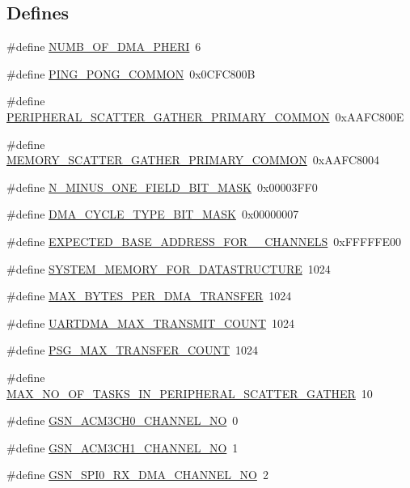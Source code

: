 \subsection*{Defines}
\begin{DoxyCompactItemize}
\item 
\#define \hyperlink{a00484_ae8e73cb3b2b2a19fc917950debfee711}{NUMB\_\-OF\_\-DMA\_\-PHERI}~6
\item 
\#define \hyperlink{a00484_a77c40078080da55358bb95deabdc19d2}{PING\_\-PONG\_\-COMMON}~0x0CFC800B
\item 
\#define \hyperlink{a00484_aca65a0bf3bfd12532c02dae5c279e8ea}{PERIPHERAL\_\-SCATTER\_\-GATHER\_\-PRIMARY\_\-COMMON}~0xAAFC800E
\item 
\#define \hyperlink{a00484_acbb264dcf72e5f414bd8ce4b5e993744}{MEMORY\_\-SCATTER\_\-GATHER\_\-PRIMARY\_\-COMMON}~0xAAFC8004
\item 
\#define \hyperlink{a00484_af41f9d4a535f48887520e136af1c4db1}{N\_\-MINUS\_\-ONE\_\-FIELD\_\-BIT\_\-MASK}~0x00003FF0
\item 
\#define \hyperlink{a00484_a40e72b47ba3036307ccfb8df8ce6437d}{DMA\_\-CYCLE\_\-TYPE\_\-BIT\_\-MASK}~0x00000007
\item 
\#define \hyperlink{a00484_a81e433569c626192ca7b5088235dbda4}{EXPECTED\_\-BASE\_\-ADDRESS\_\-FOR\_\_\-CHANNELS}~0xFFFFFE00
\item 
\#define \hyperlink{a00484_ae78fa6fe29ddd383c2c6ca1b9490130d}{SYSTEM\_\-MEMORY\_\-FOR\_\-DATASTRUCTURE}~1024
\item 
\#define \hyperlink{a00484_a9cdc76d0ead7d68830bee5508ff4a099}{MAX\_\-BYTES\_\-PER\_\-DMA\_\-TRANSFER}~1024
\item 
\#define \hyperlink{a00484_abcdb10dc038da3a0c6aa8af1d933f67b}{UARTDMA\_\-MAX\_\-TRANSMIT\_\-COUNT}~1024
\item 
\#define \hyperlink{a00484_ac8c5aeb4ff04ea6017a636ace0320dbb}{PSG\_\-MAX\_\-TRANSFER\_\-COUNT}~1024
\item 
\#define \hyperlink{a00484_acb8951c4fdb17d6f194ec2a38cd53199}{MAX\_\-NO\_\-OF\_\-TASKS\_\-IN\_\-PERIPHERAL\_\-SCATTER\_\-GATHER}~10
\item 
\#define \hyperlink{a00484_aa2bd44137b5577f645382c31da5cabd2}{GSN\_\-ACM3CH0\_\-CHANNEL\_\-NO}~0
\item 
\#define \hyperlink{a00484_a2b2db8ce0a5e10a4826bce61e6b673d5}{GSN\_\-ACM3CH1\_\-CHANNEL\_\-NO}~1
\item 
\#define \hyperlink{a00484_a09c49cb5be2c0afcec8a685ed3679134}{GSN\_\-SPI0\_\-RX\_\-DMA\_\-CHANNEL\_\-NO}~2
\item 

\end{DoxyCompactItemize}
